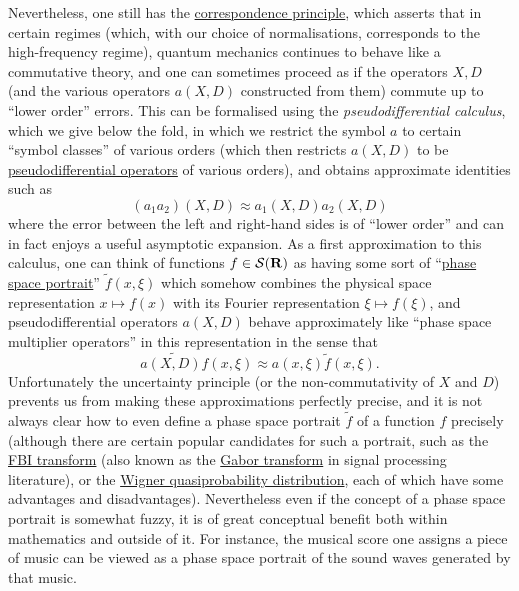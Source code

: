 \documentclass[11pt]{article}
\theoremstyle{definition}
\begin{document}
 Nevertheless, one still has the \href{https://en.wikipedia.org/wiki/Correspondence_principle}{correspondence principle}, which asserts that in certain regimes (which, with our choice of normalisations, corresponds to the high-frequency regime), quantum mechanics continues to behave like a commutative theory, and one can sometimes proceed as if the operators \({X,D}\) (and the various operators \({a(X,D)}\) constructed from them) commute up to “lower order” errors. This can be formalised using the \emph{pseudodifferential calculus}, which we give below the fold, in which we restrict the symbol \({a}\) to certain “symbol classes” of various orders (which then restricts \({a(X,D)}\) to be \href{https://en.wikipedia.org/wiki/Pseudo-differential_operator}{pseudodifferential operators} of various orders), and obtains approximate identities such as 
\[\displaystyle  (a_1 a_2)(X,D) \approx a_1(X,D) a_2(X,D)\]
 where the error between the left and right-hand sides is of “lower order” and can in fact enjoys a useful asymptotic expansion. As a first approximation to this calculus, one can think of functions \({f \in {\mathcal S}({\bf R})}\) as having some sort of “\href{https://en.wikipedia.org/wiki/Phase_portrait}{phase space portrait}” \({\tilde f(x,\xi)}\) which somehow combines the physical space representation \({x \mapsto f(x)}\) with its Fourier representation \({\xi \mapsto f(\xi)}\), and pseudodifferential operators \({a(X,D)}\) behave approximately like “phase space multiplier operators” in this representation in the sense that 
\[\displaystyle  \widetilde{a(X,D) f}(x,\xi) \approx a(x,\xi) \tilde f(x,\xi).\]
 Unfortunately the uncertainty principle (or the non-commutativity of \({X}\) and \({D}\)) prevents us from making these approximations perfectly precise, and it is not always clear how to even define a phase space portrait \({\tilde f}\) of a function \({f}\) precisely (although there are certain popular candidates for such a portrait, such as the \href{https://en.wikipedia.org/wiki/Fourier%E2%80%93Bros%E2%80%93Iagolnitzer_transform}{FBI transform} (also known as the \href{https://en.wikipedia.org/wiki/Gabor_transform}{Gabor transform} in signal processing literature), or the \href{https://en.wikipedia.org/wiki/Wigner_quasiprobability_distribution}{Wigner quasiprobability distribution}, each of which have some advantages and disadvantages). Nevertheless even if the concept of a phase space portrait is somewhat fuzzy, it is of great conceptual benefit both within mathematics and outside of it. For instance, the musical score one assigns a piece of music can be viewed as a phase space portrait of the sound waves generated by that music.
\end{document}
